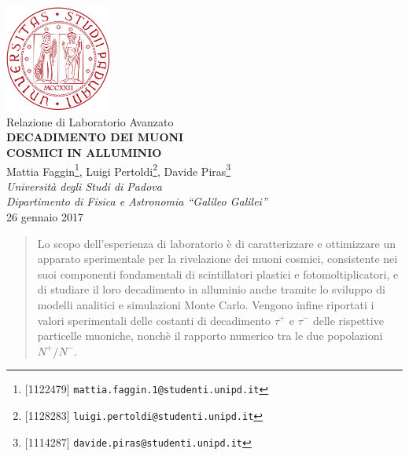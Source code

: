 \documentclass[10pt, oneside, a4paper]{article}   	%
\begin{document}
\begin{titlepage}
\thispagestyle{empty}
  \begin{center}
    \includegraphics[width=3.5cm]{img/logo.pdf}%
    \\
    \vspace{1cm}
    \Large{Relazione di Laboratorio Avanzato} \\
    \vspace{0.2cm}
    \LARGE{\textbf{DECADIMENTO DEI MUONI\\ COSMICI IN ALLUMINIO}} \\
    \vspace{0.7cm}
    \large
    Mattia Faggin\footnote{[1122479] \texttt{mattia.faggin.1@studenti.unipd.it}},
     Luigi Pertoldi\footnote{[1128283] \texttt{luigi.pertoldi@studenti.unipd.it}}, 
     Davide Piras\footnote{[1114287] \texttt{davide.piras@studenti.unipd.it}} \\
    \vspace{1.8cm}
    \textsl{Università degli Studi di Padova} \\
    \textsl{Dipartimento di Fisica e Astronomia ``Galileo Galilei''} \\
    26 gennaio 2017
%
    \vspace{1cm}
    \begin{abstract}
      \normalsize
      \noindent Lo scopo dell'esperienza di laboratorio è di caratterizzare e ottimizzare un apparato sperimentale per la rivelazione dei muoni cosmici, consistente nei suoi componenti fondamentali di scintillatori plastici e fotomoltiplicatori, e di studiare il loro decadimento in alluminio anche tramite lo sviluppo di modelli analitici e simulazioni Monte Carlo. Vengono infine riportati i valori sperimentali delle costanti di decadimento $\tau^+$ e $\tau^-$ delle rispettive particelle muoniche, nonchè il rapporto numerico tra le due popolazioni $N^+/N^-$.
    \end{abstract}
  \end{center}
\end{titlepage}
\cleardoublepage
%
\tableofcontents
\clearpage
\listoffigures
\listoftables
%
\clearpage
\end{document}

